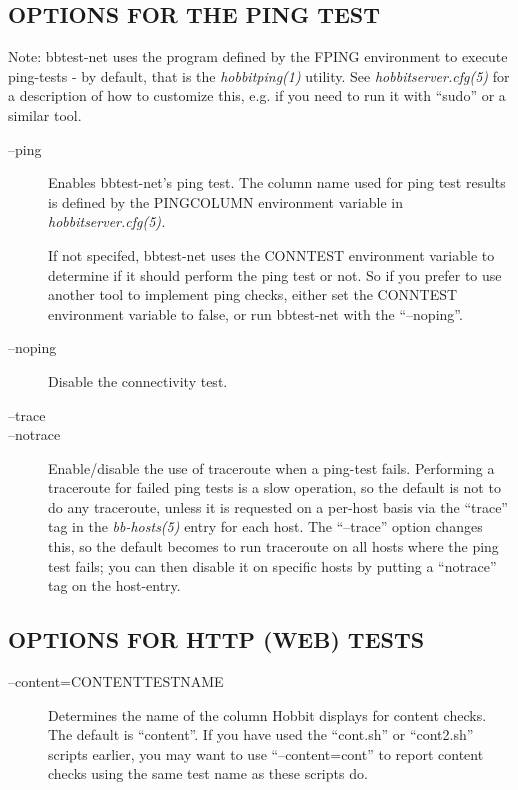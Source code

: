 \subsection{OPTIONS FOR THE PING TEST}
 Note: bbtest-net uses the program defined by the FPING environment to
 execute ping-tests - by default, that is the \emph{hobbitping(1)}
 utility. See \emph{hobbitserver.cfg(5)} for a description of how to
 customize this, e.g. if you need to run it with ``sudo'' or a similar
 tool. 


 \begin{description}
\item[--ping] Enables bbtest-net's ping test. The column name used for
  ping test results is defined by the PINGCOLUMN environment variable
  in \emph{hobbitserver.cfg(5).}

 
 If not specifed, bbtest-net uses the CONNTEST environment variable to
 determine if it should perform the ping test or not. So if you prefer
 to use another tool to implement ping checks, either set the CONNTEST
 environment variable to false, or run bbtest-net with the
 ``--noping''. 


 

\item[--noping] Disable the connectivity test. 

 

\item[--trace]
\item[--notrace] Enable/disable the use of traceroute when a ping-test
  fails. Performing a traceroute for failed ping tests is a slow
  operation, so the default is not to do any traceroute, unless it is
  requested on a per-host basis via the ``trace'' tag in the
  \emph{bb-hosts(5) } entry for each host. The ``--trace'' option
  changes this, so the default becomes to run traceroute on all hosts
  where the ping test fails; you can then disable it on specific hosts
  by putting a ``notrace'' tag on the host-entry. 


 


\end{description}

\subsection{OPTIONS FOR HTTP (WEB) TESTS}
\begin{description}
\item[--content=CONTENTTESTNAME] Determines the name of the column
  Hobbit displays for content checks. The default is ``content''. If
  you have used the ``cont.sh'' or ``cont2.sh'' scripts earlier, you
  may want to use ``--content=cont'' to report content checks using
  the same test name as these scripts do. 


\end{description}

